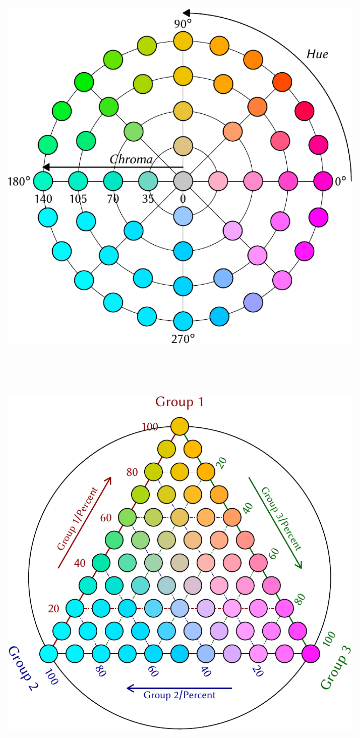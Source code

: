 \documentclass[a4paper, 12pt]{scrartcl}
\begin{document}
\begin{appendix}
\begin{figure}[!htb]
  \begin{subfigure}[t]{0.3\textwidth}
  \centering
  \includegraphics[width = \textwidth]{../fig/plot-cielch.pdf}
  \label{fig:cielch}
  \end{subfigure}%
  ~
  \begin{subfigure}[t]{0.3\textwidth}
  \includegraphics[width = \textwidth]{../fig/plot-ternary.pdf}

\end{subfigure}
\end{figure}
\end{appendix}
\end{document}
